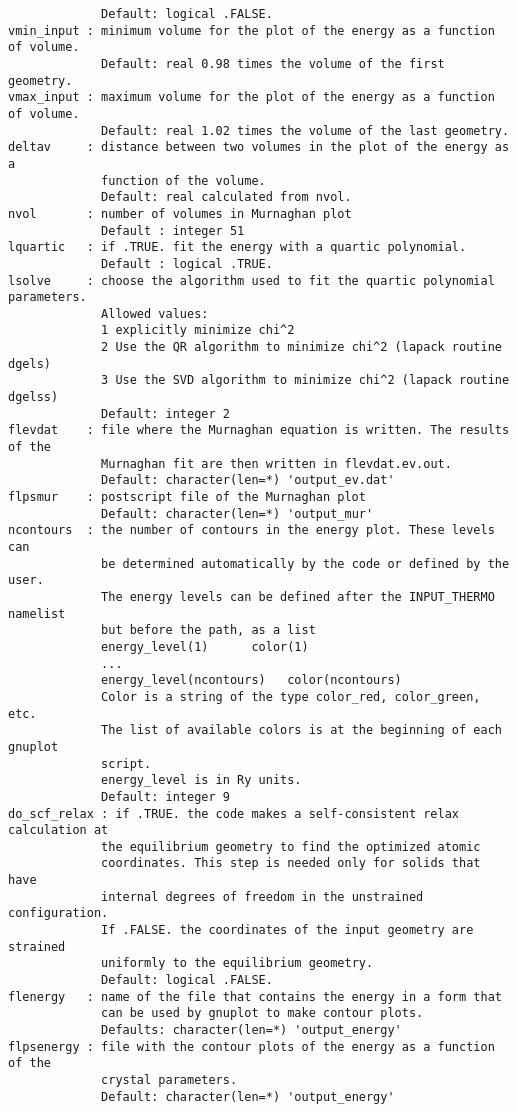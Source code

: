 \documentclass[12pt,a4paper]{article}
\begin{document}
\begin{verbatim}
             Default: logical .FALSE.
vmin_input : minimum volume for the plot of the energy as a function of volume.
             Default: real 0.98 times the volume of the first geometry.
vmax_input : maximum volume for the plot of the energy as a function of volume.
             Default: real 1.02 times the volume of the last geometry.
deltav     : distance between two volumes in the plot of the energy as a 
             function of the volume.
             Default: real calculated from nvol.
nvol       : number of volumes in Murnaghan plot
             Default : integer 51
lquartic   : if .TRUE. fit the energy with a quartic polynomial.
             Default : logical .TRUE.
lsolve     : choose the algorithm used to fit the quartic polynomial parameters.
             Allowed values:
             1 explicitly minimize chi^2
             2 Use the QR algorithm to minimize chi^2 (lapack routine dgels)
             3 Use the SVD algorithm to minimize chi^2 (lapack routine dgelss)
             Default: integer 2
flevdat    : file where the Murnaghan equation is written. The results of the
             Murnaghan fit are then written in flevdat.ev.out.
             Default: character(len=*) 'output_ev.dat'
flpsmur    : postscript file of the Murnaghan plot
             Default: character(len=*) 'output_mur'
ncontours  : the number of contours in the energy plot. These levels can
             be determined automatically by the code or defined by the user.
             The energy levels can be defined after the INPUT_THERMO namelist 
             but before the path, as a list
             energy_level(1)      color(1)
             ...
             energy_level(ncontours)   color(ncontours) 
             Color is a string of the type color_red, color_green, etc.
             The list of available colors is at the beginning of each gnuplot
             script.
             energy_level is in Ry units.
             Default: integer 9
do_scf_relax : if .TRUE. the code makes a self-consistent relax calculation at
             the equilibrium geometry to find the optimized atomic 
             coordinates. This step is needed only for solids that have 
             internal degrees of freedom in the unstrained configuration. 
             If .FALSE. the coordinates of the input geometry are strained 
             uniformly to the equilibrium geometry.
             Default: logical .FALSE. 
flenergy   : name of the file that contains the energy in a form that
             can be used by gnuplot to make contour plots.
             Defaults: character(len=*) 'output_energy'
flpsenergy : file with the contour plots of the energy as a function of the
             crystal parameters.
             Default: character(len=*) 'output_energy'
\end{verbatim}
\end{document}
